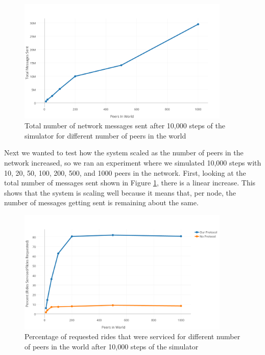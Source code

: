 \documentclass[letterpaper,11pt,twocolumn]{article}
\begin{document}
\begin{figure}[ht]
  \centering
   \includegraphics[width=0.9\textwidth]{images/messages_sent_v_peers.png}     
   \caption{Total number of network messages sent after 10,000 steps of the simulator for different number of peers in the world
           \label{messages-v-peers}}
\end{figure} 

Next we wanted to test how the system scaled as the number of peers in the network increased, so we ran an experiment where we simulated 10,000 steps with 10, 20, 50, 100, 200, 500, and 1000 peers in the network. First, looking at the total number of messages sent shown in Figure \ref{messages-v-peers}, there is a linear increase. This shows that the system is scaling well because it means that, per node, the number of messages getting sent is remaining about the same.

\begin{figure}[ht]
  \centering
   \includegraphics[width=0.9\textwidth]{images/world_density.png}     
   \caption{Percentage of requested rides that were serviced for different number of peers in the world after 10,000 steps of the simulator
           \label{world-density}}
\end{figure} 
\end{document}
